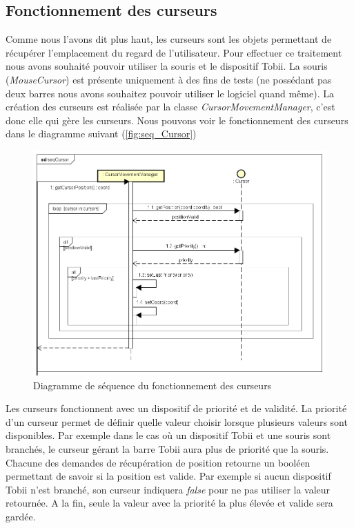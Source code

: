 \documentclass{polytech/polytech}
\begin{document}
\subsection{Fonctionnement des curseurs}
\label{sec:fonc_cursors}
Comme nous l'avons dit plus haut, les curseurs sont les objets permettant de récupérer l'emplacement du regard de l'utilisateur. Pour effectuer ce traitement nous avons souhaité pouvoir utiliser la souris et le dispositif Tobii. La souris (\textit{MouseCursor}) est présente uniquement à des fins de tests (ne possédant pas deux barres nous avons souhaitez pouvoir utiliser le logiciel quand même). La création des curseurs est réalisée par la classe \textit{CursorMovementManager}, c'est donc elle qui gère les curseurs. 
Nous pouvons voir le fonctionnement des curseurs dans le diagramme suivant (\autoref{fig:seq_Cursor})
\pagebreak
\begin{figure}
    \centering
    \includegraphics[width=15cm]{img/diagrammes/seqCursor.png}
    \caption{Diagramme de séquence du fonctionnement des curseurs}
    \label{fig:seq_Cursor}
\end{figure}
Les curseurs fonctionnent avec un dispositif de priorité et de validité. La priorité d'un curseur permet de définir quelle valeur choisir lorsque plusieurs valeurs sont disponibles. Par exemple dans le cas où un dispositif Tobii et une souris sont branchés, le curseur gérant la barre Tobii aura plus de priorité que la souris. Chacune des demandes de récupération de position retourne un booléen permettant de savoir si la position est valide. Par exemple si aucun dispositif Tobii n'est branché, son curseur indiquera \textit{false} pour ne pas utiliser la valeur retournée. A la fin, seule la valeur avec la priorité la plus élevée et valide sera gardée. 
\end{document}
